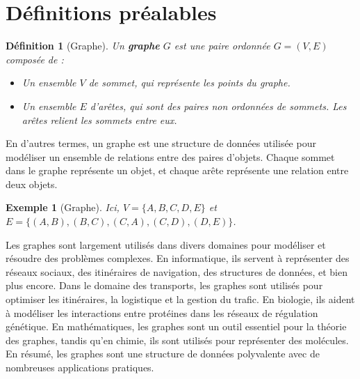 \documentclass{article}
\theoremstyle{pasdepoint}
\newtheorem{definition}{Définition}
\theoremstyle{break}
\newtheorem{example}{Exemple}
\theoremstyle{pasdepoint}
\begin{document}
\section{Définitions préalables}

\begin{definition}[Graphe]
    Un \textbf{graphe} $G$ est une paire ordonnée $G = (V, E)$ composée de :
    \begin{itemize}
        \item Un ensemble $V$ de \textit{sommet}, qui représente les points du graphe.
        \item Un ensemble $E$ d'\textit{arêtes}, qui sont des paires non ordonnées de sommets. Les arêtes relient les sommets entre eux.
    \end{itemize}
\end{definition}

En d'autres termes, un graphe est une structure de données utilisée pour modéliser un ensemble de relations entre des paires d'objets. Chaque sommet dans le graphe représente un objet, et chaque arête représente une relation entre deux objets.

    
\begin{example}[Graphe]

    Ici, $V = \{A, B, C, D, E\}$ et $E = \{(A, B), (B, C), (C, A), (C, D), (D, E)\}$.
\end{example}

Les graphes sont largement utilisés dans divers domaines pour modéliser et résoudre des problèmes complexes. En informatique, ils servent à représenter des réseaux sociaux, des itinéraires de navigation, des structures de données, et bien plus encore. Dans le domaine des transports, les graphes sont utilisés pour optimiser les itinéraires, la logistique et la gestion du trafic. En biologie, ils aident à modéliser les interactions entre protéines dans les réseaux de régulation génétique. En mathématiques, les graphes sont un outil essentiel pour la théorie des graphes, tandis qu'en chimie, ils sont utilisés pour représenter des molécules. En résumé, les graphes sont une structure de données polyvalente avec de nombreuses applications pratiques.
\end{document}
